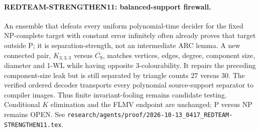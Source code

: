 \paragraph{REDTEAM-STRENGTHEN11: balanced-support firewall.}
An ensemble that defeats every uniform polynomial-time decider for the fixed
NP-complete target with constant error infinitely often already proves that
target outside P; it is separation-strength, not an intermediate ARC lemma.
A new connected pair, $K_{3,3,3}$ versus $\overline{C_9}$, matches vertices,
edges, degree, component size, diameter and 1-WL while having opposite
3-colourability.  It repairs the preceding component-size leak but is still
separated by triangle counts $27$ versus $30$.  The verified ordered decoder
transports every polynomial source-support separator to compiler images.
Thus finite invariant-fooling remains candidate testing.  Conditional $K$
elimination and the FLMV endpoint are unchanged; P versus NP remains OPEN.
See \texttt{research/agents/proof/2026-10-13\_0417\_REDTEAM-STRENGTHEN11.tex}.
